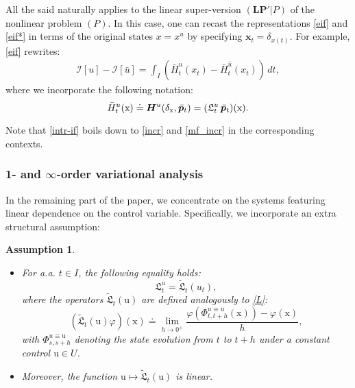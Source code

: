 \documentclass[sn-mathphys-num]{sn-jnl}
\numberwithin{equation}{section}
\theoremstyle{mythm}
\theoremstyle{mydef}
\newtheorem{assumption}{Assumption}\renewcommand{\theassumption}{(A\arabic{assumption})}  %
\renewcommand{\phi}{\varphi}
\renewcommand{\d}{\,d}
\begin{document}
All the said naturally applies to the linear super-version $(\bm{LP}'|P)$ of the nonlinear problem $(P)$. In this case, one can recast the representations \eqref{eif} and \eqref{eif*} in terms of the original states $x=x^{u}$ by specifying $\bm x_t = \delta_{x(t)}$.
For example, \eqref{eif} rewrites:
\begin{align}
    \mathcal I[u] - \mathcal I[\bar u] =  
    \int_I \left(\bar H_t^u(x_t) - \bar H_t^{\bar u}(x_t)\right) \d t,\label{intr-if}
\end{align}
where we incorporate the following notation:
\[
    \bar H_t^u(\mathrm{x}) \doteq  \bm H^u(\delta_{\rm x},  \bar{\bm p}_t)= (\mathfrak L_t^u\,\bar{\bm p}_t)(\rm x).
\]

Note that \eqref{intr-if} boils down to \eqref{incr} and
\eqref{mf_incr} in the corresponding contexts.

\subsubsection{1- and $\infty$-order variational analysis }\label{ssec:infinite}

In the remaining part of the paper, we concentrate on the systems featuring linear dependence on the control variable. Specifically, we incorporate an extra structural assumption:
\begin{tcolorbox}
\begin{assumption}
\label{a8}
~
\begin{itemize}
 
\item For a.a. \(t \in I\), the following equality holds:
\[
\mathfrak{L}_t^u = \widetilde{\mathfrak{L}}_t(u_t),
\]  
where the operators \(\widetilde{\mathfrak{L}}_t(\mathrm{u})\) are defined analogously to \eqref{L}:  
\[
(\widetilde{\mathfrak{L}}_t(\mathrm{u}) \phi)({\mathrm{x}}) \doteq \lim_{h \to 0^+} \frac{\phi\left(\Phi^{u \equiv \mathrm{u}}_{t,t+h}({\mathrm{x}})\right) - \phi({\mathrm{x}})}{h},
\]  
with \(\Phi^{u \equiv \mathrm{u}}_{s,s+h}\) denoting the state evolution from \(t\) to \(t+h\) under a constant control \(\mathrm{u} \in U\). 
   \item Moreover, the function \(\mathrm{u} \mapsto \widetilde{\mathfrak{L}}_t(\mathrm{u})\) is linear.
\end{itemize}
\end{assumption}

\end{tcolorbox}
\end{document}
